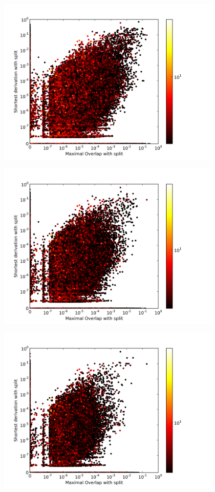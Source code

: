 \begin{figure}
\center
\includegraphics[width=\linewidth]{../data/plots/plot1.png}
\end{figure}


\begin{figure}
\center
\includegraphics[width=\linewidth]{../data/plots/plot2.png}
\end{figure}


\begin{figure}
\center
\includegraphics[width=\linewidth]{../data/plots/plot3.png}
\end{figure}